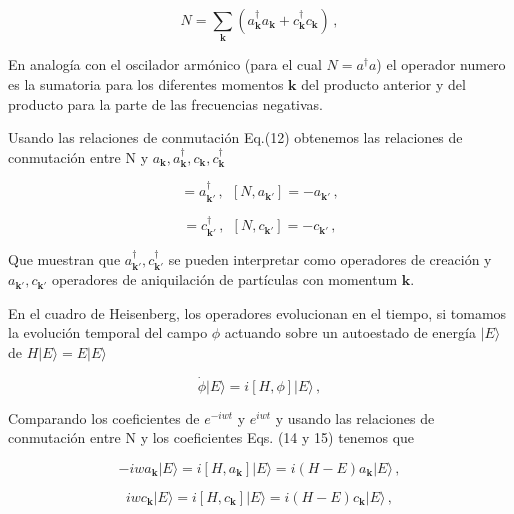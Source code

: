 \documentclass{article}
\begin{document}
\begin{equation}
  N= \sum_{\mathbf{k}}(a_{\mathbf{k}}^\dagger a_{\mathbf{k}} + c_{\mathbf{k}}^\dagger c_{\mathbf{k}} )\,,
\end{equation}

En analogía con el oscilador armónico (para el cual $N=a^\dagger a$) el operador numero es la sumatoria para los diferentes momentos $\mathbf{k}$ del producto anterior y del producto para la parte de las frecuencias negativas.

Usando las relaciones de conmutación Eq.(12) obtenemos las relaciones de conmutación entre N y $a_{\mathbf{k}},a_{\mathbf{k}}^\dagger,c_{\mathbf{k}},c_{\mathbf{k}}^\dagger$ 

\begin{equation}
  [N,a_{{\mathbf{k}}'}^\dagger] = a_{{\mathbf{k}}'}^\dagger\,, \ \  [N,a_{{\mathbf{k}}'}] = -a_{{\mathbf{k}}'}\,, 
\end{equation}

\begin{equation}
  [N,c_{{\mathbf{k}}'}^\dagger] = c_{{\mathbf{k}}'}^\dagger\,, \ \  [N,c_{{\mathbf{k}}'}] = -c_{{\mathbf{k}}'}\,,
\end{equation}

Que muestran que $a_{{\mathbf{k}}'}^\dagger, c_{{\mathbf{k}}'}^\dagger$ se pueden interpretar como operadores de creación y $a_{{\mathbf{k}}'}, c_{{\mathbf{k}}'}$ operadores de aniquilación de partículas con momentum $\mathbf{k}$.

En el cuadro de Heisenberg, los operadores evolucionan en el tiempo, si tomamos la evolución temporal del campo $\phi$ actuando sobre un autoestado de energía $|E\rangle$ de $H |E\rangle = E |E\rangle$

\begin{equation}
 \dot{\phi} |E\rangle = i[H,\phi] |E\rangle\,,
\end{equation}

Comparando los coeficientes de $e^{-iwt}$ y $e^{iwt}$ y usando las relaciones de conmutación entre N y los coeficientes Eqs. (14 y 15) tenemos que

\begin{equation}
 -iwa_{\mathbf{k}} |E\rangle = i[H,a_{\mathbf{k}}] |E\rangle  =i(H-E)a_{\mathbf{k}} |E\rangle\,,
\end{equation}

\begin{equation}
 iwc_{\mathbf{k}} |E\rangle = i[H,c_{\mathbf{k}}] |E\rangle  =i(H-E)c_{\mathbf{k}} |E\rangle\,,
\end{equation}
\end{document}
